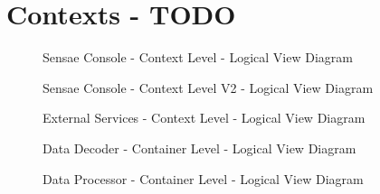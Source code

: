 \chapter{Contexts - TODO}
\label{AppendixH}

\begin{landscape}
    \begin{figure}[H]
       \centering
    \resizebox{\columnwidth}{!}
    {      
       
    }
    \caption[Sensae Console - Context Level - Logical View Diagram]{Sensae Console - Context Level - Logical View Diagram}
       \label{fig:AppendixH:contexts}
    \end{figure}
\end{landscape}

\begin{landscape}
    \begin{figure}[H]
       \centering
    \resizebox{\columnwidth}{!}
    {      
       
    }
    \caption[Sensae Console - Context Level V2 - Logical View Diagram]{Sensae Console - Context Level V2 - Logical View Diagram}
       \label{fig:AppendixH:contextsv2}
    \end{figure}
\end{landscape}

\begin{figure}[H]
    \centering
    \resizebox{\columnwidth}{!}
    {      
        
    }
    \caption[External Services - Context Level - Logical View Diagram]{External Services - Context Level - Logical View Diagram}
    \label{fig:AppendixH:servicecontexts}
\end{figure}

\begin{figure}[H]
    \centering
    \resizebox{\columnwidth}{!}
        {      
        
        }
    \caption[Data Decoder - Container Level - Logical View Diagram]{Data Decoder - Container Level - Logical View Diagram}
    \label{fig:AppendixH:decoder}
\end{figure}

\begin{figure}[H]
    \centering
    \resizebox{\columnwidth}{!}
        {      
        
        }
    \caption[Data Processor - Container Level - Logical View Diagram]{Data Processor - Container Level - Logical View Diagram}
    \label{fig:AppendixH:processor}
\end{figure}

